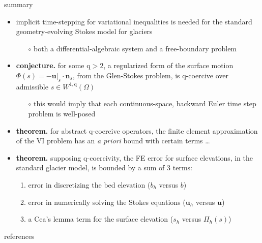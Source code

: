 \documentclass[10pt,svgnames]{beamer}
\newcommand{\bn}{\mathbf{n}}
\newcommand{\bu}{\mathbf{u}}
\newcommand{\qq}{\mathrm{q}}
\begin{document}
\begin{frame}{summary}
\begin{itemize}
\item implicit time-stepping for variational inequalities is needed for the standard geometry-evolving Stokes model for glaciers
    \begin{itemize}
    \item[$\circ$] both a differential-algebraic system and a free-boundary problem
    \end{itemize}
\item<2-4> \textbf{conjecture.} for some $\qq>2$, a regularized form of the surface motion $\Phi(s) = -\bu|_s\cdot \bn_s$, from the Glen-Stokes problem, is $\qq$-coercive over admissible $s\in W^{1,\qq}(\Omega)$
    \begin{itemize}
    \item[$\circ$] this would imply that each continuous-space, backward Euler time step problem is well-posed
    \end{itemize}
\item<3-4> \textbf{theorem.} for abstract $\qq$-coercive operators, the finite element approximation of the VI problem has an \emph{a priori} bound with certain terms \dots
\item<4> \textbf{theorem.} supposing $\qq$-coercivity, the FE error for surface elevations, in the standard glacier model, is bounded by a sum of 3 terms:
    \begin{enumerate}
    \item error in discretizing the bed elevation ($b_h$ versus $b$)
    \item error in numerically solving the Stokes equations ($\bu_h$ versus $\bu$)
    \item a Cea's lemma term for the surface elevation ($s_h$ versus $\Pi_h(s)$) \strut
    \end{enumerate}
\end{itemize}
\end{frame}


\begin{frame}{references}

{\footnotesize }
\end{frame}
\end{document}
